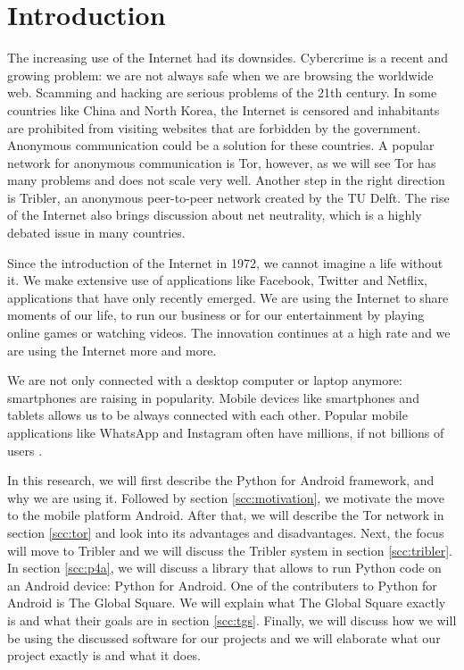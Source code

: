 \section{Introduction}
	The increasing use of the Internet had its downsides. Cybercrime is a recent and growing problem: we are not always safe when we are browsing the worldwide web. Scamming and hacking are serious problems of the 21th century. In some countries like China and North Korea, the Internet is censored and inhabitants are prohibited from visiting websites that are forbidden by the government. Anonymous communication could be a solution for these countries. A popular network for anonymous communication is Tor, however, as we will see Tor has many problems and does not scale very well. Another step in the right direction is Tribler, an anonymous peer-to-peer network created by the TU Delft. The rise of the Internet also brings discussion about net neutrality, which is a highly debated issue in many countries.
	
	Since the introduction of the Internet in 1972\cite{leiner1997past}, we cannot imagine a life without it. We make extensive use of applications like Facebook, Twitter and Netflix, applications that have only recently emerged. We are using the Internet to share moments of our life, to run our business or for our entertainment by playing online games or watching videos. The innovation continues at a high rate and we are using the Internet more and more.
	
	We are not only connected with a desktop computer or laptop anymore: smartphones are raising in popularity. Mobile devices like smartphones and tablets allows us to be always connected with each other. Popular mobile applications like WhatsApp and Instagram often have millions, if not billions of users \cite{googleplayinstagram, googleplaywhatsapp}.
	
	In this research, we will first describe the Python for Android framework, and why we are using it. Followed by section \ref{scc:motivation}, we motivate the move to the mobile platform Android. After that, we will describe the Tor network in section \ref{scc:tor} and look into its advantages and disadvantages. Next, the focus will move to Tribler and we will discuss the Tribler system in section \ref{scc:tribler}. In section \ref{scc:p4a}, we will discuss a library that allows to run Python code on an Android device: Python for Android. One of the contributers to Python for Android is The Global Square. We will explain what The Global Square exactly is and what their goals are in section \ref{scc:tgs}. Finally, we will discuss how we will be using the discussed software for our projects and we will elaborate what our project exactly is and what it does.